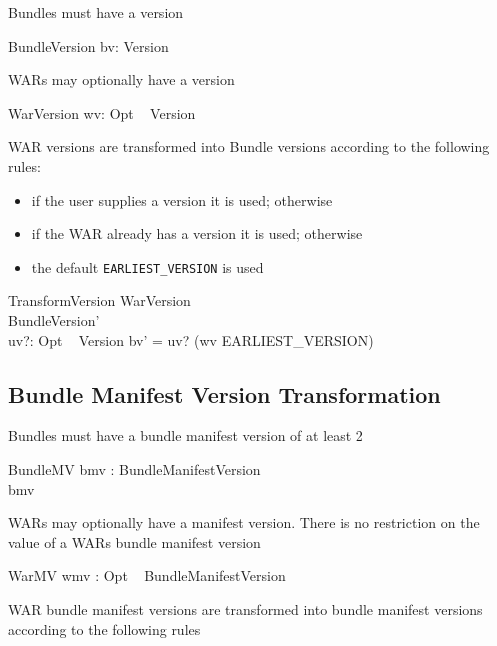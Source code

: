 \documentclass[a4paper,12pt]{article}
\begin{document}
Bundles must have a version

\begin{schema}{BundleVersion}
bv: Version
\end{schema}

WARs may optionally have a version

\begin{schema}{WarVersion}
wv: Opt ~ Version
\end{schema}

WAR versions are transformed into Bundle versions according to the following rules:

\begin{itemize}
\item if the user supplies a version it is used; otherwise
\item if the WAR already has a version it is used; otherwise
\item the default {\tt EARLIEST\_VERSION} is used
\end{itemize}

\begin{schema}{TransformVersion}
WarVersion \\
BundleVersion' \\
uv?: Opt ~ Version
\where
bv' = uv?   (wv   EARLIEST\_VERSION)
\end{schema}

\subsection{Bundle Manifest Version Transformation}

Bundles must have a bundle manifest version of at least 2

\begin{schema}{BundleMV}
bmv : BundleManifestVersion \\
\where
bmv  \\
\end{schema}

WARs may optionally have a manifest version. There is no restriction on the value of a WARs bundle manifest version

\begin{schema}{WarMV}
wmv : Opt ~ BundleManifestVersion \\
\end{schema}

WAR bundle manifest versions are transformed into bundle manifest versions according to the following rules
\end{document}

